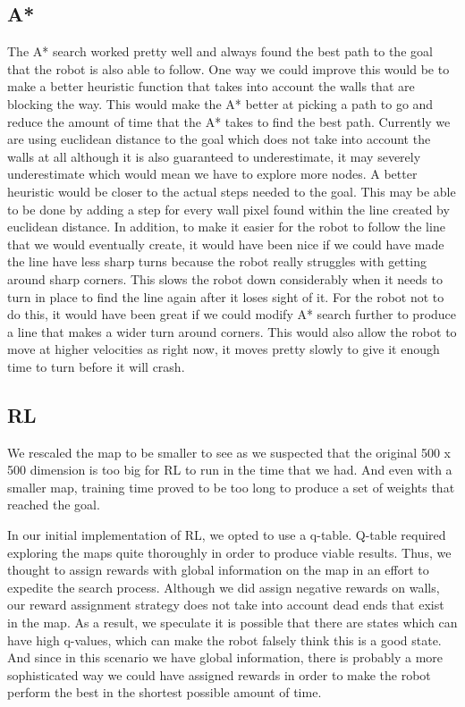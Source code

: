 \documentclass[11pt]{article}
\begin{document}
    \subsection{A*}
    The A* search worked pretty well and always found the best path to the goal that the robot is also able to follow. One way we could improve this would be to make a better heuristic function that takes into account the walls that are blocking the way. This would make the A* better at picking a path to go and reduce the amount of time that the A* takes to find the best path. Currently we are using euclidean distance to the goal which does not take into account the walls at all although it is also guaranteed to underestimate, it may severely underestimate which would mean we have to explore more nodes. A better heuristic would be closer to the actual steps needed to the goal. This may be able to be done by adding a step for every wall pixel found within the line created by euclidean distance. In addition, to make it easier for the robot to follow the line that we would eventually create, it would have been nice if we could have made the line have less sharp turns because the robot really struggles with getting around sharp corners. This slows the robot down considerably when it needs to turn in place to find the line again after it loses sight of it. For the robot not to do this, it would have been great if we could modify A* search further to produce a line that makes a wider turn around corners. This would also allow the robot to move at higher velocities as right now, it moves pretty slowly to give it enough time to turn before it will crash.

    \subsection{RL}

    We rescaled the map to be smaller to see as we suspected that the original 500 x 500 dimension is too big for RL to run in the time that we had. And even with a smaller map, training time proved to be too long to produce a set of weights that reached the goal. 

    In our initial implementation of RL, we opted to use a q-table. Q-table required exploring the maps quite thoroughly in order to produce viable results. Thus, we thought to assign rewards with global information on the map in an effort to expedite the search process. Although we did assign negative rewards on walls, our reward assignment strategy does not take into account dead ends that exist in the map. As a result, we speculate it is possible that there are states which can have high q-values, which can make the robot falsely think this is a good state. And since in this scenario we have global information, there is probably a more sophisticated way we could have assigned rewards in order to make the robot perform the best in the shortest possible amount of time.
\end{document}
